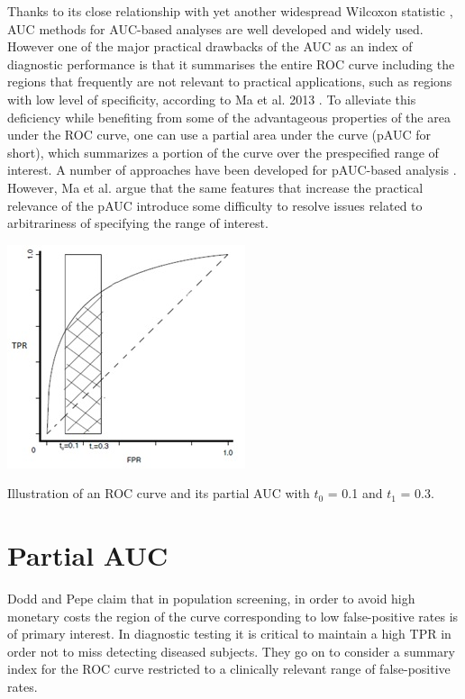 Thanks to its close relationship with yet another widespread Wilcoxon statistic \citep{hanley1982useauc}, AUC methods for AUC-based analyses are well developed and widely used. However one of the major practical drawbacks of the AUC as an index of diagnostic performance is that it summarises the entire ROC curve including the regions that frequently are not relevant to practical applications, such as regions with low level of specificity, according to Ma et al. 2013 \citep{ma2013paucdiagperf}. To alleviate this deficiency while benefiting from some of the advantageous properties of the area under the ROC curve, one can use a partial area under the curve (pAUC for short), which summarizes a portion of the curve over the prespecified range of interest. A number of approaches have been developed for pAUC-based analysis \citep{dodd2003pauc,he2010nonparagenomic,mcclish1989paucanal,zhang2002nonparpaucapp}. However, Ma et al. argue that the same features that increase the practical relevance of the pAUC introduce some difficulty to resolve issues related to arbitrariness of specifying the range of interest. 

\begin{marginfigure}
	\includegraphics{roc_curves/Figure4.png}
	\caption{Illustration of an ROC curve and its partial AUC with $t_{0}$ = 0.1 and $t_{1}$ = 0.3.}
	\label{fig:partial-auc}
\end{marginfigure}

\section{Partial AUC} 
Dodd and Pepe \citep{dodd2003pauc} claim that in population screening, in order to avoid high monetary costs the region of the curve corresponding to low false-positive rates is of primary interest. In diagnostic testing it is critical to maintain a high TPR in order not to miss detecting diseased subjects. They go on to consider a summary index for the ROC curve restricted to a clinically relevant range of false-positive rates.

